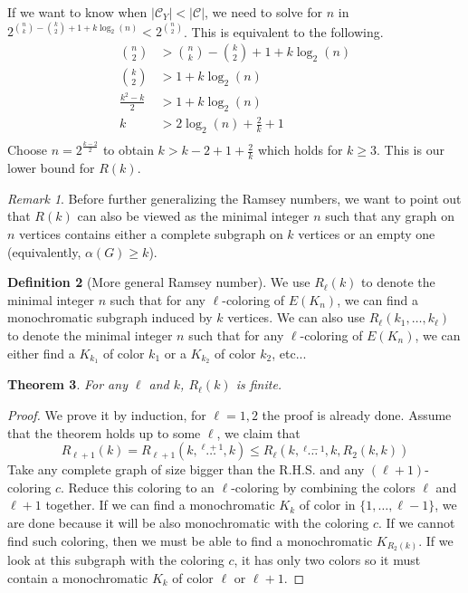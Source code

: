 \documentclass{tufte-handout}
\newtheorem{thm}{Theorem}
\theoremstyle{definition}
\newtheorem{defn}[thm]{Definition}
\theoremstyle{remark}
\newtheorem{rem}[thm]{Remark}
\begin{document}
If we want to know when $|\mathcal{C}_Y| < |\mathcal{C}|$, we need to solve for $n$ in $2^{\binom{n}{k}-\binom{k}{2} + 1 + k\log_2(n)} < 2^{\binom{n}{2}}$. This is equivalent to the following.
\begin{align*}
	\binom{n}{2} &> \binom{n}{k}-\binom{k}{2} + 1 + k\log_2(n)\\
	\binom{k}{2} &> 1 + k\log_2(n)\\
	\frac{k^2-k}{2} &> 1 + k\log_2(n)\\
	k &> 2\log_2(n) + \frac{2}{k} + 1\\
\end{align*}
Choose $n=2^{\frac{k-2}{2}}$ to obtain $k > k-2+1+\frac{2}{k}$ which holds for $k \geq 3$. This is our lower bound for $R(k)$.
\begin{rem}
	Before further generalizing the Ramsey numbers, we want to point out that $R(k)$ can also be viewed as the minimal integer $n$ such that any graph on $n$ vertices contains either a complete subgraph on $k$ vertices or an empty one (equivalently, $\alpha(G) \geq k$).
\end{rem}
\begin{defn}[More general Ramsey number]
	We use $R_{\ell}(k)$ to denote the minimal integer $n$ such that for any $\ell$-coloring of $E(K_n)$, we can find a monochromatic subgraph induced by $k$ vertices. We can also use $R_{\ell}(k_1, \dots, k_{\ell})$ to denote the minimal integer $n$ such that for any $\ell$-coloring of $E(K_n)$, we can either find a $K_{k_1}$ of color $k_1$ or a $K_{k_2}$ of color $k_2$, etc...
\end{defn}
\begin{thm}
	For any $\ell$ and $k$, $R_{\ell}(k)$ is finite.
\end{thm}
\begin{proof}
	We prove it by induction, for $\ell=1,2$ the proof is already done. Assume that the theorem holds up to some $\ell$, we claim that
	\[R_{\ell+1}(k) = R_{\ell+1}(k,\stackrel{\ell+1}{\dots}, k) \leq R_{\ell}(k, \stackrel{\ell-1}{\dots},k,R_2(k,k))\]
	Take any complete graph of size bigger than the R.H.S. and any $(\ell+1)$-coloring $c$. Reduce this coloring to an $\ell$-coloring by combining the colors $\ell$ and $\ell+1$ together. If we can find a monochromatic $K_k$ of color in $\{1,\dots, \ell-1\}$, we are done because it will be also monochromatic with the coloring $c$. If we cannot find such coloring, then we must be able to find a monochromatic $K_{R_2(k)}$. If we look at this subgraph with the coloring $c$, it has only two colors so it must contain a monochromatic $K_k$ of color $\ell$ or $\ell+1$.
\end{proof}
\end{document}
